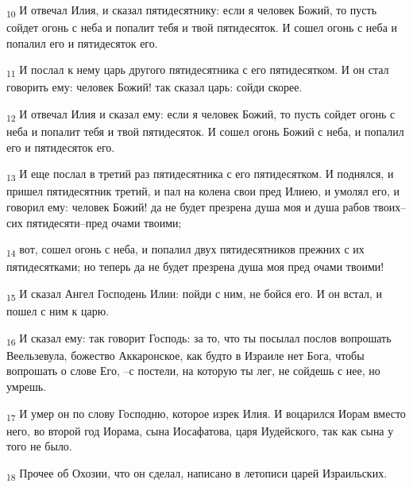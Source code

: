\begin{tcolorbox}
\textsubscript{10} И отвечал Илия, и сказал пятидесятнику: если я человек Божий, то пусть сойдет огонь с неба и попалит тебя и твой пятидесяток. И сошел огонь с неба и попалил его и пятидесяток его.
\end{tcolorbox}
\begin{tcolorbox}
\textsubscript{11} И послал к нему царь другого пятидесятника с его пятидесятком. И он стал говорить ему: человек Божий! так сказал царь: сойди скорее.
\end{tcolorbox}
\begin{tcolorbox}
\textsubscript{12} И отвечал Илия и сказал ему: если я человек Божий, то пусть сойдет огонь с неба и попалит тебя и твой пятидесяток. И сошел огонь Божий с неба, и попалил его и пятидесяток его.
\end{tcolorbox}
\begin{tcolorbox}
\textsubscript{13} И еще послал в третий раз пятидесятника с его пятидесятком. И поднялся, и пришел пятидесятник третий, и пал на колена свои пред Илиею, и умолял его, и говорил ему: человек Божий! да не будет презрена душа моя и душа рабов твоих--сих пятидесяти--пред очами твоими;
\end{tcolorbox}
\begin{tcolorbox}
\textsubscript{14} вот, сошел огонь с неба, и попалил двух пятидесятников прежних с их пятидесятками; но теперь да не будет презрена душа моя пред очами твоими!
\end{tcolorbox}
\begin{tcolorbox}
\textsubscript{15} И сказал Ангел Господень Илии: пойди с ним, не бойся его. И он встал, и пошел с ним к царю.
\end{tcolorbox}
\begin{tcolorbox}
\textsubscript{16} И сказал ему: так говорит Господь: за то, что ты посылал послов вопрошать Веельзевула, божество Аккаронское, как будто в Израиле нет Бога, чтобы вопрошать о слове Его, --с постели, на которую ты лег, не сойдешь с нее, но умрешь.
\end{tcolorbox}
\begin{tcolorbox}
\textsubscript{17} И умер он по слову Господню, которое изрек Илия. И воцарился Иорам вместо него, во второй год Иорама, сына Иосафатова, царя Иудейского, так как сына у того не было.
\end{tcolorbox}
\begin{tcolorbox}
\textsubscript{18} Прочее об Охозии, что он сделал, написано в летописи царей Израильских.
\end{tcolorbox}

